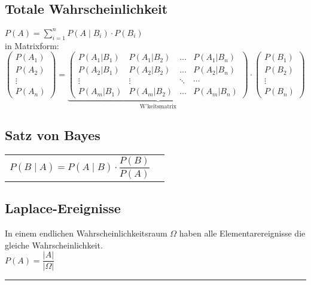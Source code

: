 \begin{minipage}[t]{11.5cm}
	\subsection{Totale Wahrscheinlichkeit }
		$\boxed{P(A)=\sum\limits_{i=1}^n P(A\mid B_i)\cdot P(B_i)}$ \\
	
		in Matrixform: \\
		$\begin{pmatrix}P(A_1)\\P(A_2)\\\vdots\\P(A_n)\end{pmatrix} = 
		\underbrace{\begin{pmatrix}P(A_1|B_1) & P(A_1|B_2) & \ldots & P(A_1|B_n) \\
		P(A_2|B_1) & P(A_2|B_2) & \ldots & P(A_2|B_n) \\
		\vdots & \vdots & \ddots & \cdots \\
		P(A_m|B_1) & P(A_m|B_2) & \ldots & P(A_m|B_n)\end{pmatrix}}_{\text{W'keitsmatrix}}
		\cdot \begin{pmatrix}P(B_1)\\P(B_2)\\\vdots\\P(B_n)\end{pmatrix}$
	\end{minipage}
\begin{minipage}[t]{7cm}
\subsection{Satz von Bayes }
\begin{tabular}{ll}
  $\boxed{P(B\mid A)=P(A\mid B) \cdot\dfrac{P(B)}{P(A)}}$
  \vspace{1mm}
\end{tabular}
\subsection{Laplace-Ereignisse }
In einem endlichen Wahrscheinlichkeitsraum $\Omega$ haben alle
Elementarereignisse die gleiche Wahrscheinlichkeit. \\
$\boxed{P(A)=\dfrac{\left| A\right|}{\left|\Omega\right|}}$ \\
\end{minipage}

\hrule

